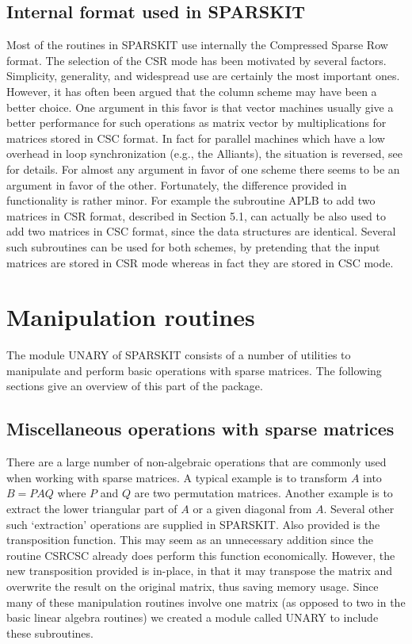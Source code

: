 \subsection{Internal format used in SPARSKIT}
Most of the routines in SPARSKIT  use internally the Compressed
Sparse Row format. The selection of 
the CSR mode has been motivated by several factors. Simplicity,
generality, and widespread use are certainly the most 
important ones. However, it has often been argued 
that the column scheme may
have been a better choice. One argument in this favor is that
vector machines usually give a better performance for such 
operations as matrix vector by multiplications for matrices
stored in CSC format. In fact for parallel machines which
have a low overhead in loop synchronization (e.g., the Alliants),
the situation is reversed, see \cite{Saad-Boeing} for details.
For almost any argument in favor of one scheme there seems
to be an argument in favor of the other. Fortunately,
the difference provided in functionality is rather minor.
For example the subroutine APLB to add two matrices in CSR format,
described in Section 5.1, can actually be also used to add 
two matrices in CSC format, since the data structures
are identical. Several such subroutines can be used for both
schemes, by pretending that the input matrices
are stored in CSR mode whereas in fact they are 
stored in CSC mode. 

\section{Manipulation routines} The module UNARY   
of SPARSKIT consists of a  number of  utilities to  manipulate and perform
basic operations with sparse matrices. The  following sections 
give an overview of this part of the package.

\subsection{Miscellaneous operations with sparse matrices}
There are a large number of non-algebraic operations that
are commonly used when working with sparse matrices. 
A typical example is to transform $A$ into $B = P A Q $
where $P$ and $Q$ are two permutation matrices. 
Another example is to extract the lower triangular
part of $A$ or a given diagonal from $A$. Several other 
such `extraction' operations are supplied in SPARSKIT. 
Also provided is the transposition function. This may seem
as an unnecessary addition since the routine 
CSRCSC already does perform this function economically. However,
the new transposition provided is in-place, in that it may
transpose the matrix and overwrite the result on the original matrix,
thus saving memory usage. Since many of these manipulation routines
involve one matrix (as opposed to two in the basic linear algebra routines)
we created a module called  UNARY to include these subroutines.

